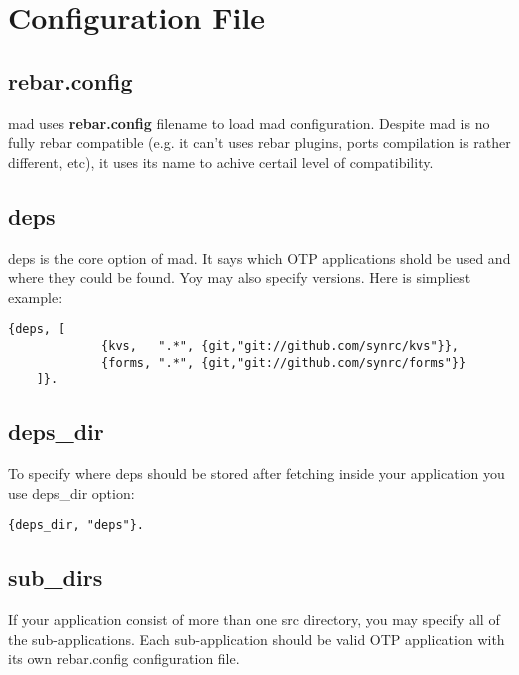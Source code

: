 \section{Configuration File}

\subsection{rebar.config}

mad uses {\bf rebar.config} filename to load mad configuration.
Despite mad is no fully rebar compatible (e.g. it can't uses
rebar plugins, ports compilation is rather different, etc),
it uses its name to achive certail level of compatibility.

\subsection{deps}

deps is the core option of mad. It says which OTP applications
shold be used and where they could be found. Yoy may also specify
versions. Here is simpliest example:

\vspace{1\baselineskip}
\begin{lstlisting}[caption=deps Option]
    {deps, [
             {kvs,   ".*", {git,"git://github.com/synrc/kvs"}},
             {forms, ".*", {git,"git://github.com/synrc/forms"}}
    ]}.
\end{lstlisting}
\vspace{1\baselineskip}

\subsection{deps\_dir}

To specify where deps should be stored after fetching inside
your application you use deps\_dir option:

\vspace{1\baselineskip}
\begin{lstlisting}[caption=deps\_dir Option]
    {deps_dir, "deps"}.
\end{lstlisting}
\vspace{1\baselineskip}

\subsection{sub\_dirs}

If your application consist of more than one src
directory, you may specify all of the sub-applications.
Each sub-application should be valid OTP application
with its own rebar.config configuration file.

